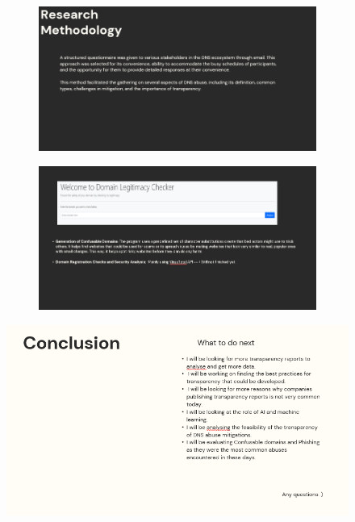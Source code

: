\begin{figure}[H]
  \centering
  \begin{subfigure}[b]{0.55\textwidth}
    \includegraphics[width=\textwidth]{appendix/pre9.png}
    \label{fig:left}
  \end{subfigure}
  \hfill %
  \begin{subfigure}[b]{0.55\textwidth}
    \includegraphics[width=\textwidth]{appendix/pre10.png}
    \label{fig:right}
  \end{subfigure}
  \label{fig:images}
\end{figure}

\begin{figure}[H]
    \centering
    \includegraphics[width=0.55\linewidth]{appendix/pre11.png}
    \label{fig:lol}
\end{figure}


